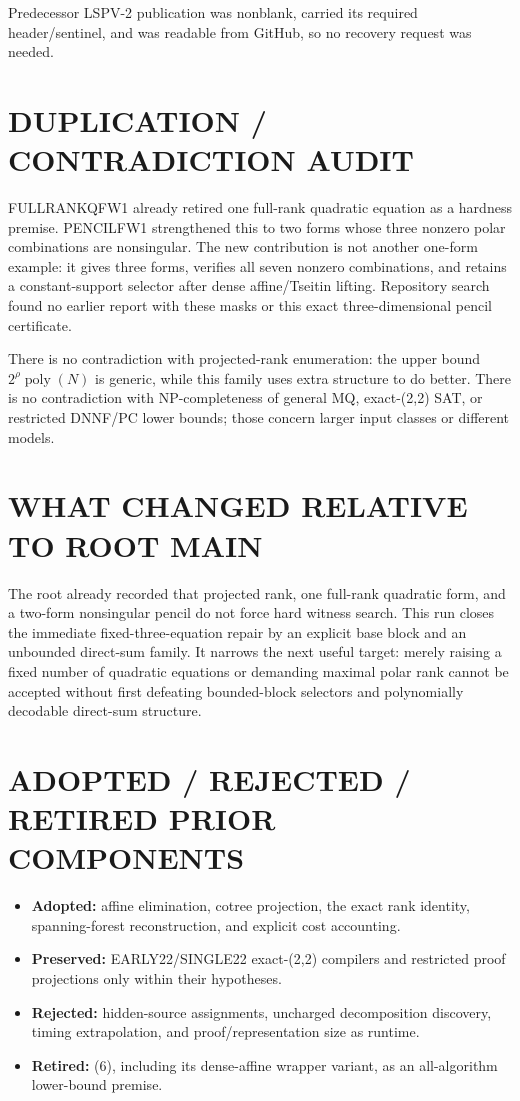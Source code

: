 \documentclass[11pt]{article}
\begin{document}
Predecessor LSPV-2 publication
was nonblank, carried its required header/sentinel, and was readable from
GitHub, so no recovery request was needed.

\section{DUPLICATION / CONTRADICTION AUDIT}
FULLRANKQFW1 already retired one full-rank quadratic equation as a hardness
premise.  PENCILFW1 strengthened this to two forms whose three nonzero polar
combinations are nonsingular.  The new contribution is not another one-form
example: it gives three forms, verifies all seven nonzero combinations, and
retains a constant-support selector after dense affine/Tseitin lifting.
Repository search found no earlier report with these masks or this exact
three-dimensional pencil certificate.

There is no contradiction with projected-rank enumeration: the upper bound
$2^\rho\operatorname{poly}(N)$ is generic, while this family uses extra
structure to do better.  There is no contradiction with NP-completeness of
general MQ, exact-(2,2) SAT, or restricted DNNF/PC lower bounds; those concern
larger input classes or different models.

\section{WHAT CHANGED RELATIVE TO ROOT MAIN}
The root already recorded that projected rank, one full-rank quadratic form,
and a two-form nonsingular pencil do not force hard witness search.  This run
closes the immediate fixed-three-equation repair by an explicit base block
and an unbounded direct-sum family.  It narrows the next useful target: merely
raising a fixed number of quadratic equations or demanding maximal polar
rank cannot be accepted without first defeating bounded-block selectors and
polynomially decodable direct-sum structure.

\section{ADOPTED / REJECTED / RETIRED PRIOR COMPONENTS}
\begin{itemize}
\item \textbf{Adopted:} affine elimination, cotree projection, the exact
rank identity, spanning-forest reconstruction, and explicit cost accounting.
\item \textbf{Preserved:} EARLY22/SINGLE22 exact-(2,2) compilers and
restricted proof projections only within their hypotheses.
\item \textbf{Rejected:} hidden-source assignments, uncharged decomposition
discovery, timing extrapolation, and proof/representation size as runtime.
\item \textbf{Retired:} (6), including its dense-affine wrapper variant, as
an all-algorithm lower-bound premise.
\end{itemize}
\end{document}
